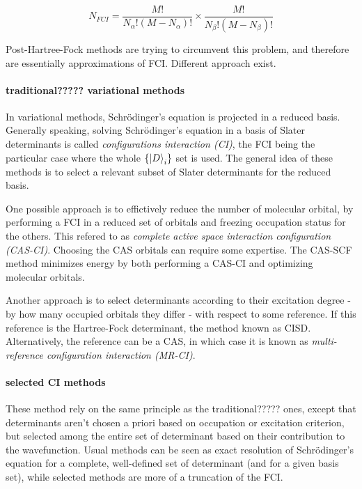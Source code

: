 \documentclass[./thesis.tex]{subfiles}
\begin{document}
\begin{equation}
N_{FCI} = \frac{M!}{N_\alpha ! (M-N_\alpha)!} \times \frac{M!}{N_\beta ! (M-N_\beta)!}
\end{equation}

Post-Hartree-Fock methods are trying to circumvent this problem, and therefore are essentially approximations of FCI. Different approach exist.


\paragraph{traditional????? variational methods}
In variational methods, Schrödinger's equation is projected in a reduced basis.
Generally speaking, solving Schrödinger's equation in a basis of Slater determinants is called \emph{configurations interaction (CI)}, the FCI being the particular case where the whole $\{\ket D_i \}$ set is used. The general idea of these methods is to select a relevant subset of Slater determinants for the reduced basis.


One possible approach is to effictively reduce the number of molecular orbital, by performing a FCI in a reduced set of orbitals and freezing occupation status for the others. This refered to as \emph{complete active space interaction configuration (CAS-CI)}. Choosing the CAS orbitals can require some expertise. The CAS-SCF method minimizes energy by both performing a CAS-CI and optimizing molecular orbitals.

Another approach is to select determinants according to their excitation degree - by how many occupied orbitals they differ - with respect to some reference. If this reference is the Hartree-Fock determinant, the method known as CISD. Alternatively, the reference can be a CAS, in which case it is known as \emph{multi-reference configuration interaction (MR-CI)}.


\paragraph{selected CI methods}
These method rely on the same principle as the traditional????? ones, except that determinants aren't chosen a priori based on occupation or excitation criterion, but selected among the entire set of determinant based on their contribution to the wavefunction. Usual methods can be seen as exact resolution of Schrödinger's equation for a complete, well-defined set of determinant (and for a given basis set), while selected methods are more of a truncation of the FCI.
\end{document}
